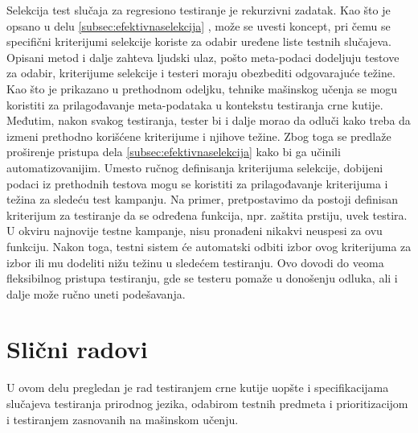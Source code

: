 \documentclass[a4paper]{article}
\begin{document}
Selekcija test slučaja za regresiono testiranje je rekurzivni zadatak. Kao što je opsano u delu \ref{subsec:efektivnaselekcija}
, može se uvesti koncept, pri čemu se specifični kriterijumi selekcije koriste za odabir uređene liste testnih slučajeva. Opisani metod i dalje zahteva ljudski ulaz, pošto meta-podaci dodeljuju testove za odabir, kriterijume selekcije i
testeri moraju obezbediti odgovarajuće težine. Kao što je prikazano u prethodnom odeljku, tehnike mašinskog učenja se mogu koristiti za prilagođavanje meta-podataka u kontekstu testiranja crne kutije. Međutim, nakon svakog testiranja, tester bi i dalje morao da odluči kako treba da izmeni prethodno korišćene kriterijume i njihove težine. Zbog toga se predlaže proširenje pristupa dela \ref{subsec:efektivnaselekcija}
 kako bi ga učinili automatizovanijim. Umesto ručnog definisanja kriterijuma selekcije, dobijeni podaci iz prethodnih testova mogu se koristiti za prilagođavanje kriterijuma i težina za sledeću test kampanju. Na primer, pretpostavimo da postoji definisan kriterijum za testiranje da se određena funkcija, npr. zaštita prstiju, uvek testira. U okviru najnovije testne kampanje, nisu pronađeni nikakvi neuspesi za ovu funkciju. Nakon toga, testni sistem će automatski odbiti izbor ovog kriterijuma za izbor ili mu dodeliti nižu težinu u sledećem testiranju. Ovo dovodi do veoma fleksibilnog pristupa testiranju, gde se testeru pomaže u donošenju odluka, ali i dalje može ručno uneti podešavanja.
\bigbreak


\section{Slični radovi}
\label{sec:slicniradovi}


U ovom delu pregledan je rad testiranjem crne kutije uopšte i specifikacijama slučajeva testiranja prirodnog jezika, odabirom testnih predmeta i prioritizacijom i testiranjem zasnovanih na mašinskom učenju.
\bigbreak
\end{document}
